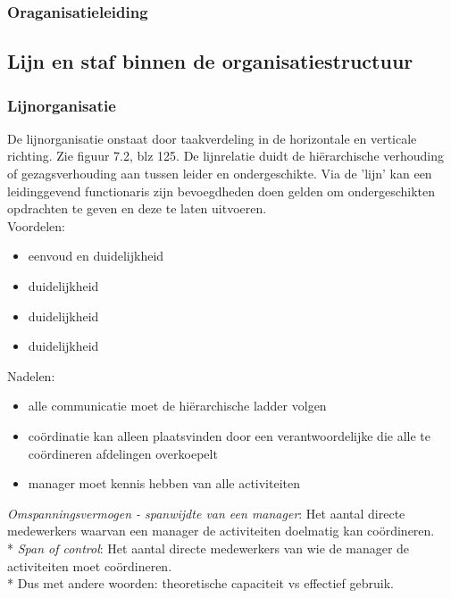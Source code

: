 \documentclass[12pt]{article}
\begin{document}
\subsubsection{Oraganisatieleiding}
\subsection{Lijn en staf binnen de organisatiestructuur}
\subsubsection{Lijnorganisatie}
De lijnorganisatie onstaat door taakverdeling in de horizontale en verticale richting. Zie figuur 7.2, blz 125. De lijnrelatie duidt de hi\"erarchische verhouding of gezagsverhouding aan tussen leider en ondergeschikte. Via de 'lijn' kan een leidinggevend functionaris zijn bevoegdheden doen gelden om ondergeschikten opdrachten te geven en deze te laten uitvoeren.\\
Voordelen:
\begin{itemize}
\item eenvoud en duidelijkheid
\item duidelijkheid
\item duidelijkheid
\item duidelijkheid
\end{itemize}
Nadelen:
\begin{itemize}
\item alle communicatie moet de hi\"erarchische ladder volgen
\item co\"ordinatie kan alleen plaatsvinden door een verantwoordelijke die alle te co\"ordineren afdelingen overkoepelt
\item manager moet kennis hebben van alle activiteiten
\end{itemize}
\textit{Omspanningsvermogen - spanwijdte van een manager}: Het aantal directe medewerkers waarvan een manager de activiteiten doelmatig kan co\"ordineren.\\*
\textit{Span of control}: Het aantal directe medewerkers van wie de manager de activiteiten moet co\"ordineren.\\*
Dus met andere woorden: theoretische capaciteit vs effectief gebruik.
\end{document}
